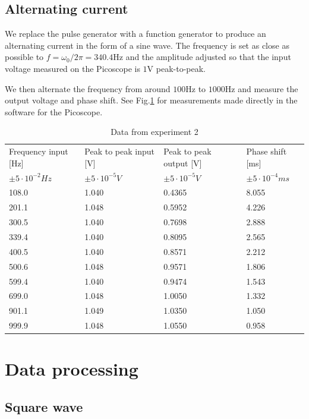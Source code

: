 \documentclass[../main/main.tex]{subfiles}
\begin{document}
\subsection*{Alternating current}

We replace the pulse generator with a function generator to produce an alternating current in the form of a sine wave.
The frequency is set as close as possible to \(  f = \omega_0 / 2 \pi = 340.4 \si{\hertz} \) and the amplitude adjusted so that the input voltage measured on the Picoscope is \( 1 \si{\volt} \) peak-to-peak.

We then alternate the frequency from around \( 100 \si{\hertz} \) to \( 1000 \si{\hertz} \) and measure the output voltage and phase shift.
See Fig.\ref{data} for measurements made directly in the software for the Picoscope.

\begin{table}[!h]
\centering
\caption{Data from experiment 2}
\label{data}
\begin{tabular}{|l|l|l|l|}
\hline
Frequency input [Hz]  & Peak to peak input [V]  & Peak to peak output [V]  & Phase shift [ms] \\
\(\pm 5 \cdot 10^{-2}Hz\) & \(\pm 5\cdot 10^{-5}V\) & \(\pm 5 \cdot 10^{-5}V\) & \(\pm 5\cdot 10^{-4}ms\) \\ \hline
108.0 & 1.040 & 0.4365 & 8.055 \\ \hline
201.1 & 1.048 & 0.5952 & 4.226 \\ \hline
300.5 & 1.040 & 0.7698 & 2.888 \\ \hline
339.4 & 1.040 & 0.8095 & 2.565 \\ \hline
400.5 & 1.040 & 0.8571 & 2.212 \\ \hline
500.6 & 1.048 & 0.9571 & 1.806 \\ \hline
599.4 & 1.040 & 0.9474 & 1.543 \\ \hline
699.0 & 1.048 & 1.0050 & 1.332 \\ \hline
901.1 & 1.049 & 1.0350 & 1.050 \\ \hline
999.9 & 1.048 & 1.0550 & 0.958 \\ \hline
\end{tabular}
\end{table}

\section{Data processing}

\subsection*{Square wave}
\end{document}
